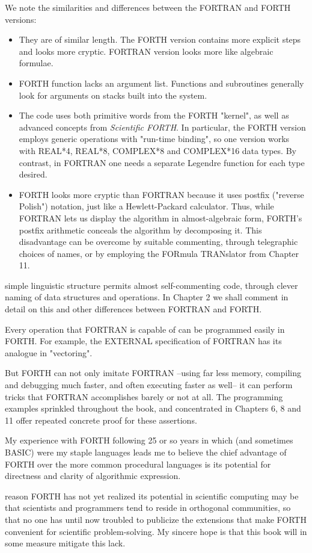 We note the similarities and differences between the FORTRAN and FORTH versions:

\begin{itemize}
    \item They are of similar length. The FORTH version contains more explicit steps and looks more cryptic. FORTRAN version looks more like algebraic formulae.
    \item FORTH function lacks an argument list. Functions and subroutines generally look for arguments on stacks built into the system.
    \item The code uses both primitive words from the FORTH "kernel", as well as advanced concepts from \textit{Scientific FORTH}. In particular, the FORTH version employs generic operations with "run-time binding", so one version works with REAL*4, REAL*8, COMPLEX*8 and COMPLEX*16 data types. By contrast, in FORTRAN one needs a separate Legendre function for each type desired.
    \item FORTH looks more cryptic than FORTRAN because it uses postfix ("reverse Polish") notation, just like a Hewlett-Packard calculator. Thus, while FORTRAN lets us display the algorithm in almost-algebraic form, FORTH's postfix arithmetic conceals the algorithm by decomposing it. This disadvantage can be overcome by suitable commenting, through telegraphic choices of names, or by employing the FORmula TRANslator from Chapter 11.
\end{itemize}

 simple linguistic structure permits almost self-commenting code, through clever naming of data structures and operations. In Chapter 2 we shall comment in detail on this and other differences between FORTRAN and FORTH.
 
Every operation that FORTRAN is capable of can be programmed easily in FORTH. For example, the EXTERNAL specification of FORTRAN has its analogue in "vectoring".

But FORTH can not only imitate FORTRAN --using far less memory, compiling and debugging much faster, and often executing faster as well-- it can perform tricks that FORTRAN accomplishes barely or not at all. The programming examples sprinkled throughout the book, and concentrated in Chapters 6, 8 and 11 offer repeated concrete proof for these assertions.

My experience with FORTH following 25 or so years in which (and sometimes BASIC) were my staple languages leads me to believe the chief advantage of FORTH over the more common procedural languages is its potential for directness and clarity of algorithmic expression.
 
 reason FORTH has not yet realized its potential in scientific computing may be that scientists and programmers tend to reside in orthogonal communities, so that no one has until now troubled to publicize the extensions that make FORTH convenient for scientific problem-solving. My sincere hope is that this book will in some measure mitigate this lack.